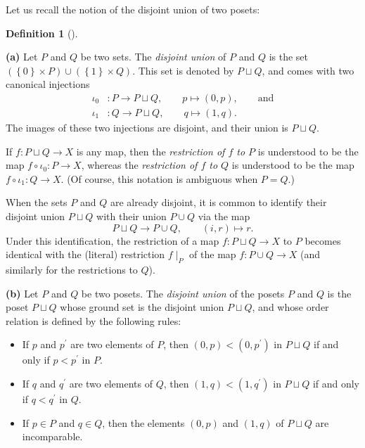 \documentclass[numbers=enddot,12pt,final,onecolumn,notitlepage]{scrartcl}%
\theoremstyle{definition}
\newtheorem{defi}[theo]{Definition}
\newenvironment{definition}[1][]
{\begin{defi}[#1]\begin{leftbar}}
{\end{leftbar}\end{defi}}
\begin{document}
Let us recall the notion of the disjoint union of two posets:

\begin{definition}
\textbf{(a)} Let $P$ and $Q$ be two sets.
The \textit{disjoint union} of $P$ and $Q$ is the set
$\left( \left\{0\right\} \times P \right)
              \cup \left( \left\{1\right\} \times Q \right)$.
This set is denoted by $P \sqcup Q$,
and comes with two canonical injections
\begin{align*}
\iota_0 &: P \to P \sqcup Q, \qquad  p \mapsto \left(0, p\right), \qquad \text{and} \\
\iota_1 &: Q \to P \sqcup Q, \qquad  q \mapsto \left(1, q\right).
\end{align*}
The images of these two injections are disjoint, and their
union is $P \sqcup Q$.

If $f : P \sqcup Q \to X$ is any map, then the
\textit{restriction of $f$ to $P$} is understood to be the
map $f \circ \iota_0 : P \to X$, whereas the
\textit{restriction of $f$ to $Q$} is understood to be the
map $f \circ \iota_1 : Q \to X$.
(Of course, this notation is ambiguous when $P = Q$.)

When the sets $P$ and $Q$ are already disjoint, it is common
to identify their disjoint union $P \sqcup Q$ with their
union $P \cup Q$ via the map
\[
P \sqcup Q \to P \cup Q, \qquad \left(i, r\right) \mapsto r .
\]
Under this identification, the restriction of a map
$f : P \sqcup Q \to X$ to $P$ becomes identical with the
(literal) restriction $f\mid_P$ of the map $f : P \cup Q \to X$
(and similarly for the restrictions to $Q$).

\textbf{(b)} Let $P$ and $Q$ be two posets.
The \textit{disjoint union} of the posets $P$ and $Q$ is the poset
$P \sqcup Q$ whose ground set is the disjoint union $P \sqcup Q$,
and whose order relation is defined by the following rules:
\begin{itemize}
\item If $p$ and $p^{\prime}$ are two elements of $P$, then
      $\left(0, p\right) < \left(0, p^{\prime}\right)$ in $P \sqcup Q$
      if and only if $p < p^{\prime}$ in $P$.
\item If $q$ and $q^{\prime}$ are two elements of $Q$, then
      $\left(1, q\right) < \left(1, q^{\prime}\right)$ in $P \sqcup Q$
      if and only if $q < q^{\prime}$ in $Q$.
\item If $p \in P$ and $q \in Q$,
      then the elements $\left(0, p\right)$ and $\left(1, q\right)$
      of $P \sqcup Q$ are incomparable.
\end{itemize}
\end{definition}
\end{document}
